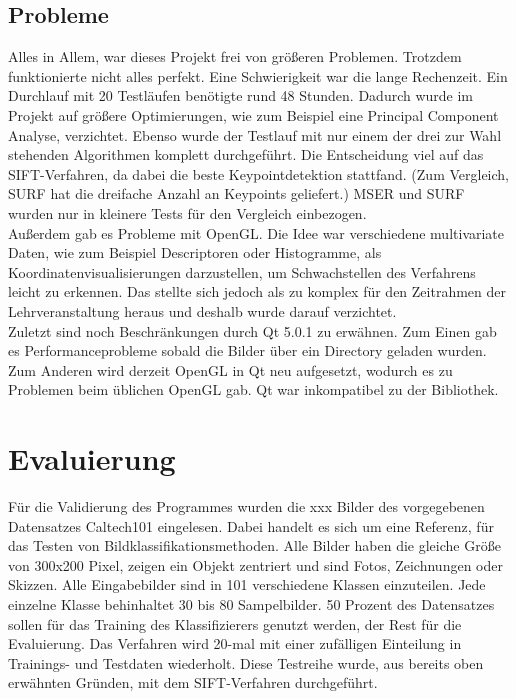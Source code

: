 \documentclass[liststotoc,11pt,a4paper]{article}
\begin{document}

\subsection{Probleme}
Alles in Allem, war dieses Projekt frei von größeren Problemen. Trotzdem funktionierte nicht alles perfekt. Eine Schwierigkeit war die lange Rechenzeit. Ein Durchlauf mit 20 Testläufen benötigte rund 48 Stunden.%
Dadurch wurde im Projekt auf größere Optimierungen, wie zum Beispiel eine Principal Component Analyse, verzichtet. Ebenso wurde der Testlauf mit nur einem der drei zur Wahl stehenden Algorithmen komplett durchgeführt. Die Entscheidung viel auf das SIFT-Verfahren, da dabei die beste Keypointdetektion stattfand. (Zum Vergleich, SURF hat die dreifache Anzahl an Keypoints geliefert.) MSER und SURF wurden nur in kleinere Tests für den Vergleich einbezogen. 
\\Außerdem gab es Probleme mit OpenGL. Die Idee war verschiedene multivariate Daten, wie zum Beispiel Descriptoren oder Histogramme, als Koordinatenvisualisierungen darzustellen, um Schwachstellen des Verfahrens leicht zu erkennen. Das stellte sich jedoch als zu komplex für den Zeitrahmen der Lehrveranstaltung heraus und deshalb wurde darauf verzichtet.
\\Zuletzt sind noch Beschränkungen durch Qt 5.0.1 zu erwähnen. Zum Einen gab es Performanceprobleme sobald die Bilder über ein Directory geladen wurden. Zum Anderen wird derzeit OpenGL in Qt neu aufgesetzt, wodurch es zu Problemen beim üblichen OpenGL gab. Qt war inkompatibel zu der Bibliothek.

\section{Evaluierung}
Für die Validierung des Programmes wurden die xxx %
Bilder des vorgegebenen Datensatzes Caltech101 eingelesen. Dabei handelt es sich um eine Referenz, für das Testen von Bildklassifikationsmethoden. Alle Bilder haben die gleiche Größe von 300x200 Pixel, zeigen ein Objekt zentriert und sind Fotos, Zeichnungen oder Skizzen. Alle Eingabebilder sind in 101 verschiedene Klassen einzuteilen. Jede einzelne Klasse behinhaltet 30 bis 80 Sampelbilder. 
50 Prozent des Datensatzes sollen für das Training des Klassifizierers genutzt werden, der Rest für die Evaluierung. Das Verfahren wird 20-mal mit einer zufälligen Einteilung in Trainings- und Testdaten wiederholt.
Diese Testreihe wurde, aus bereits oben erwähnten Gründen, mit dem SIFT-Verfahren durchgeführt.
\end{document}
